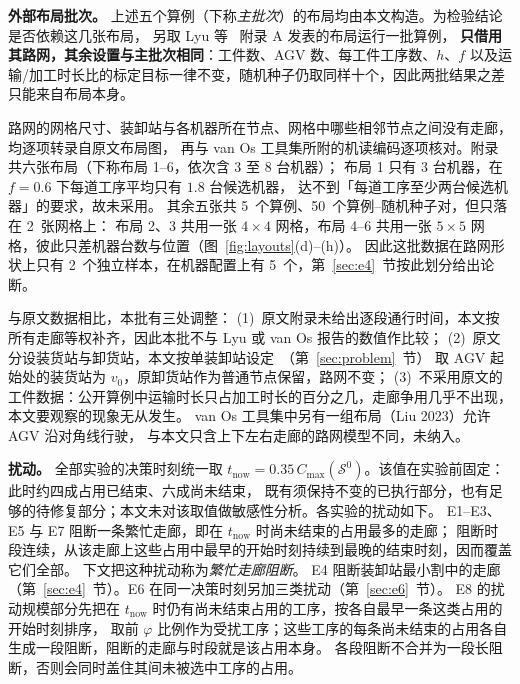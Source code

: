\documentclass[manuscript,screen,review]{acmart}
\newcommand{\NPubInst}{5}
\newcommand{\NPubPairs}{50}
\newcommand{\NPubNets}{2}
\begin{document}
\textbf{外部布局批次。}
上述五个算例（下称\emph{主批次}）的布局均由本文构造。为检验结论是否依赖这几张布局，
另取 Lyu 等~\cite{lyu2019approach} 附录 A 发表的布局运行一批算例，
\textbf{只借用其路网，其余设置与主批次相同}：工件数、AGV 数、每工件工序数、\(h\)、\(f\)
以及运输/加工时长比的标定目标一律不变，随机种子仍取同样十个，因此两批结果之差只能来自布局本身。

路网的网格尺寸、装卸站与各机器所在节点、网格中哪些相邻节点之间没有走廊，均逐项转录自原文布局图，
再与 van Os 工具集所附的机读编码逐项核对。附录共六张布局（下称布局 1--6，依次含 \(3\) 至 \(8\) 台机器）；
布局 1 只有 \(3\) 台机器，在 \(f=0.6\) 下每道工序平均只有 \(1.8\) 台候选机器，
达不到「每道工序至少两台候选机器」的要求，故未采用。
其余五张共 \NPubInst\ 个算例、\NPubPairs\ 个算例--随机种子对，但只落在 \NPubNets\ 张网格上：
布局 2、3 共用一张 \(4\times4\) 网格，布局 4--6 共用一张 \(5\times5\) 网格，彼此只差机器台数与位置（图~\ref{fig:layouts}(d)--(h)）。
因此这批数据在路网形状上只有 \NPubNets\ 个独立样本，在机器配置上有 \NPubInst\ 个，第~\ref{sec:e4}~节按此划分给出论断。

与原文数据相比，本批有三处调整：
(1)~原文附录未给出逐段通行时间，本文按所有走廊等权补齐，因此本批不与 Lyu 或 van Os 报告的数值作比较；
(2)~原文分设装货站与卸货站，本文按单装卸站设定~\cite{fontes2023hybrid}（第~\ref{sec:problem}~节）
取 AGV 起始处的装货站为 \(v_0\)，原卸货站作为普通节点保留，路网不变；
(3)~不采用原文的工件数据：公开算例中运输时长只占加工时长的百分之几，走廊争用几乎不出现，
本文要观察的现象无从发生。
van Os 工具集中另有一组布局（Liu 2023）允许 AGV 沿对角线行驶，
与本文只含上下左右走廊的路网模型不同，未纳入。

\textbf{扰动。}
全部实验的决策时刻统一取 \(t_{\mathrm{now}}=0.35\,C_{\max}(\mathcal{S}^0)\)。该值在实验前固定：此时约四成占用已结束、六成尚未结束，
既有须保持不变的已执行部分，也有足够的待修复部分；本文未对该取值做敏感性分析。各实验的扰动如下。
E1--E3、E5 与 E7 阻断一条繁忙走廊，即在 \(t_{\mathrm{now}}\) 时尚未结束的占用最多的走廊；
阻断时段连续，从该走廊上这些占用中最早的开始时刻持续到最晚的结束时刻，因而覆盖它们全部。
下文把这种扰动称为\emph{繁忙走廊阻断}。
E4 阻断装卸站最小割中的走廊（第~\ref{sec:e4}~节）。E6 在同一决策时刻另加三类扰动（第~\ref{sec:e6}~节）。
E8 的扰动规模部分先把在 \(t_{\mathrm{now}}\) 时仍有尚未结束占用的工序，按各自最早一条这类占用的开始时刻排序，
取前 \(\varphi\) 比例作为受扰工序；这些工序的每条尚未结束的占用各自生成一段阻断，阻断的走廊与时段就是该占用本身。
各段阻断不合并为一段长阻断，否则会同时盖住其间未被选中工序的占用。
\end{document}

